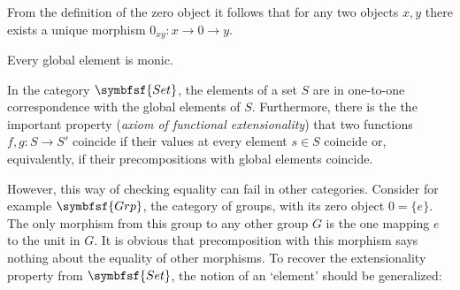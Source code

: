     \begin{property}
        From the definition of the zero object it follows that for any two objects $x,y$ there exists a unique morphism $0_{xy}:x\rightarrow0\rightarrow y$.
    \end{property}

    \begin{property}
        Every global element is monic.
    \end{property}


    \begin{remark}\label{cat:global_elements_remark}
        In the category $\symbfsf{Set}$, the elements of a set $S$ are in one-to-one correspondence with the global elements of $S$. Furthermore, there is the the important property (\textit{axiom of functional extensionality}) that two functions $f,g:S\rightarrow S'$ coincide if their values at every element $s\in S$ coincide or, equivalently, if their precompositions with global elements coincide.

        However, this way of checking equality can fail in other categories. Consider for example $\symbfsf{Grp}$, the category of groups, with its zero object $0=\{e\}$. The only morphism from this group to any other group $G$ is the one mapping $e$ to the unit in $G$. It is obvious that precomposition with this morphism says nothing about the equality of other morphisms. To recover the extensionality property from $\symbfsf{Set}$, the notion of an `element' should be generalized:
    \end{remark}

